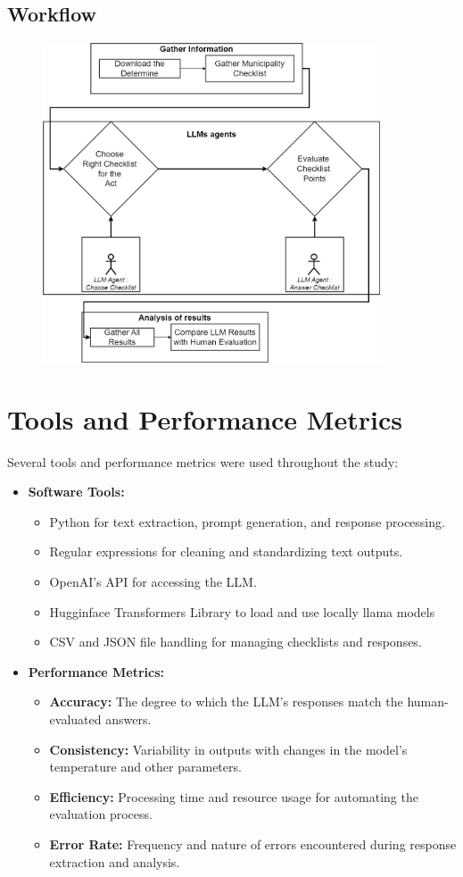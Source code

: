 \documentclass[../main.tex]{subfiles}
\begin{document}
 \subsection*{Workflow}
 \begin{figure}[H]
    \includegraphics[width=10cm]{Graphs/0.Workflow.png}
\end{figure}


\section{Tools and Performance Metrics}
Several tools and performance metrics were used throughout the study:

\begin{itemize}
    \item \textbf{Software Tools:}
    \begin{itemize}
        \item Python for text extraction, prompt generation, and response processing.
        \item Regular expressions for cleaning and standardizing text outputs.
        \item OpenAI's API for accessing the LLM.
        \item Hugginface Transformers Library to load and use locally llama models
        \item CSV and JSON file handling for managing checklists and responses.
    \end{itemize}
    \item \textbf{Performance Metrics:}
    \begin{itemize}
        \item \textbf{Accuracy:} The degree to which the LLM's responses match the human-evaluated answers.
        \item \textbf{Consistency:} Variability in outputs with changes in the model's temperature and other parameters.
        \item \textbf{Efficiency:} Processing time and resource usage for automating the evaluation process.
        \item \textbf{Error Rate:} Frequency and nature of errors encountered during response extraction and analysis.
    \end{itemize}
\end{itemize}
\end{document}
